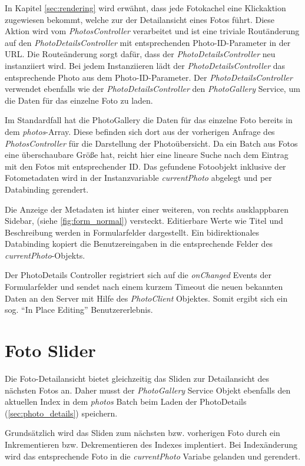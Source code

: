 In Kapitel \ref{sec:rendering} wird erwähnt, dass jede Fotokachel eine Klickaktion zugewiesen bekommt, welche zur der Detailansicht eines Fotos führt. Diese Aktion wird vom \textit{PhotosController} verarbeitet und ist eine triviale Routänderung auf den \textit{PhotoDetailsController} mit entsprechenden Photo-ID-Parameter in der URL. Die Routeänderung sorgt dafür, dass der \textit{PhotoDetailsController} neu instanziiert wird. Bei jedem Instanziieren lädt der \textit{PhotoDetailsController} das entsprechende Photo aus dem  Photo-ID-Parameter. Der \textit{PhotoDetailsController} verwendet ebenfalls wie der \textit{PhotoDetailsController} den \textit{PhotoGallery} Service, um die Daten für das einzelne Foto zu laden.

Im Standardfall hat die PhotoGallery die Daten für das einzelne Foto bereits in dem \textit{photos}-Array. Diese befinden sich dort aus der vorherigen Anfrage des \textit{PhotosController} für die Darstellung der Photoübersicht. Da ein Batch aus Fotos eine überschaubare Größe hat, reicht hier eine lineare Suche nach dem Eintrag mit den Fotos mit entsprechender ID. Das gefundene Fotoobjekt inklusive der Fotometadaten wird in der Instanzvariable \textit{currentPhoto} abgelegt und per Databinding gerendert.

Die Anzeige der Metadaten ist hinter einer weiteren, von rechts ausklappbaren Sidebar, (siehe \ref{fig:form_normal}) versteckt. Editierbare Werte wie Titel und Beschreibung werden in Formularfelder dargestellt. Ein bidirektionales Databinding kopiert die Benutzereingaben in die entsprechende Felder des \textit{currentPhoto}-Objekts.

Der PhotoDetails Controller registriert sich auf die \textit{onChanged } Events der Formularfelder und sendet nach einem kurzem Timeout die neuen bekannten Daten an den Server mit Hilfe des \textit{PhotoClient} Objektes. Somit ergibt sich ein sog. ``In Place Editing'' Benutzererlebnis.

\section{Foto Slider}
\label{sec:photo_slider}

Die Foto-Detailansicht bietet gleichzeitig das Sliden zur Detailansicht des nächsten Fotos an. Daher musst der \textit{PhotoGallery} Service Objekt ebenfalls den aktuellen Index in dem \textit{photos} Batch beim Laden der PhotoDetails (\ref{sec:photo_details}) speichern.

Grundsätzlich wird das Sliden zum nächsten bzw. vorherigen Foto durch ein Inkrementieren bzw. Dekrementieren des Indexes implentiert. Bei Indexänderung wird das entsprechende Foto in die \textit{currentPhoto} Variabe gelanden und gerendert.

